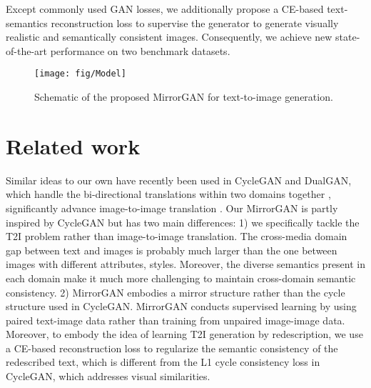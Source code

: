 \documentclass[10pt,twocolumn,letterpaper]{article}
\begin{document}
 Except commonly used GAN losses, we additionally propose a CE-based text-semantics reconstruction loss to supervise the generator to generate visually realistic and semantically consistent images. Consequently, we achieve new state-of-the-art performance on two benchmark datasets.

\begin{figure*}[tb!]
\centering
\noindent\texttt{[image: fig/Model]}
\protect\caption{Schematic of the proposed MirrorGAN for text-to-image generation.}
\label{fig:Model}
\end{figure*}

\section{Related work}
Similar ideas to our own have recently been used in CycleGAN and DualGAN, which handle the bi-directional translations within two domains together \cite{zhu2017unpaired,yi2017dualgan,Almahairi2018AugmentedCL}, significantly advance image-to-image translation \cite{isola2016image,taigman2016unsupervised,johnson2016perceptual,Yu2018Inpainting,qiao2019ancient}. Our MirrorGAN is partly inspired by CycleGAN but has two main differences: 1) we specifically tackle the T2I problem rather than image-to-image translation. The cross-media domain gap between text and images is probably much larger than the one between images with different attributes,  styles. Moreover, the diverse semantics present in each domain make it much more challenging to maintain cross-domain semantic consistency. 2) MirrorGAN embodies a mirror structure rather than the cycle structure used in CycleGAN. MirrorGAN conducts supervised learning by using paired text-image data rather than training from unpaired image-image data. Moreover, to embody the idea of learning T2I generation by redescription, we use a CE-based reconstruction loss to regularize the semantic consistency of the redescribed text, which is different from the L1 cycle consistency loss in CycleGAN, which addresses visual similarities.
\end{document}
